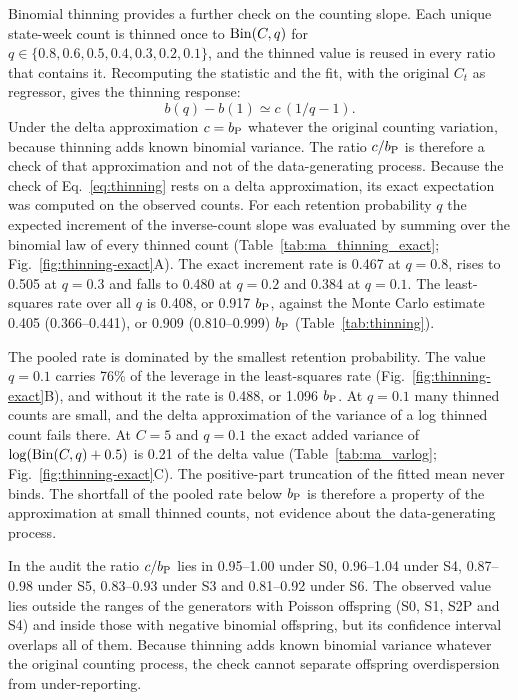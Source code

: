 Binomial thinning provides a further check on the counting slope. Each unique state-week count is thinned once to $\operatorname{Bin}(C,q)$ for $q\in\{0.8,0.6,0.5,0.4,0.3,0.2,0.1\}$, and the thinned value is reused in every ratio that contains it. Recomputing the statistic and the fit, with the original $C_t$ as regressor, gives the thinning response:
\begin{equation}
b(q)-b(1)\simeq c\,(1/q-1).
\label{eq:thinning}
\end{equation}
Under the delta approximation $c=b_{\mathrm P}$ whatever the original counting variation, because thinning adds known binomial variance. The ratio $c/b_{\mathrm P}$ is therefore a check of that approximation and not of the data-generating process. Because the check of Eq.~\eqref{eq:thinning} rests on a delta approximation, its exact expectation was computed on the observed counts. For each retention probability $q$ the expected increment of the inverse-count slope was evaluated by summing over the binomial law of every thinned count (Table~\ref{tab:ma_thinning_exact}; Fig.~\ref{fig:thinning-exact}A). The exact increment rate is 0.467 at $q=0.8$, rises to 0.505 at $q=0.3$ and falls to 0.480 at $q=0.2$ and 0.384 at $q=0.1$. The least-squares rate over all $q$ is 0.408, or 0.917 $b_{\mathrm P}$, against the Monte Carlo estimate 0.405 (0.366--0.441), or 0.909 (0.810--0.999) $b_{\mathrm P}$ (Table~\ref{tab:thinning}).

The pooled rate is dominated by the smallest retention probability. The value $q=0.1$ carries 76\% of the leverage in the least-squares rate (Fig.~\ref{fig:thinning-exact}B), and without it the rate is 0.488, or 1.096 $b_{\mathrm P}$. At $q=0.1$ many thinned counts are small, and the delta approximation of the variance of a log thinned count fails there. At $C=5$ and $q=0.1$ the exact added variance of $\log(\operatorname{Bin}(C,q)+0.5)$ is 0.21 of the delta value (Table~\ref{tab:ma_varlog}; Fig.~\ref{fig:thinning-exact}C). The positive-part truncation of the fitted mean never binds. The shortfall of the pooled rate below $b_{\mathrm P}$ is therefore a property of the approximation at small thinned counts, not evidence about the data-generating process.

In the audit the ratio $c/b_{\mathrm P}$ lies in 0.95--1.00 under S0, 0.96--1.04 under S4, 0.87--0.98 under S5, 0.83--0.93 under S3 and 0.81--0.92 under S6. The observed value lies outside the ranges of the generators with Poisson offspring (S0, S1, S2P and S4) and inside those with negative binomial offspring, but its confidence interval overlaps all of them. Because thinning adds known binomial variance whatever the original counting process, the check cannot separate offspring overdispersion from under-reporting.

